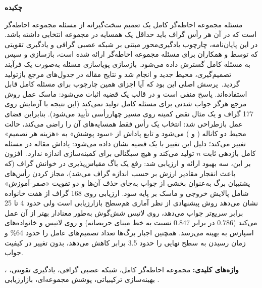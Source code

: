 \documentclass[12pt,a4paper,oneside]{report}
\providecommand{\num}[1]{#1}
\theoremstyle{definition}
\theoremstyle{plain}
\begin{document}
\begin{center}
  {\Large\bfseries چکیده}
\end{center}
\vspace{0.4cm}
\noindent
مسئله مجموعه احاطه‌گر کامل یک تعمیم سخت‌گیرانه از مسئله مجموعه احاطه‌گر است که
در آن هر رأس گراف باید حداقل یک همسایه در مجموعه انتخابی داشته باشد. در این
پایان‌نامه، چارچوب یادگیری‌محور مبتنی بر شبکه عصبی گرافی و یادگیری تقویتی که
توسط  و همکاران برای مسئله مجموعه احاطه‌گر ارائه شده است، بازسازی و
سپس به مسئله کامل گسترش داده می‌شود. بازسازی پویا‌سازی مسئله به‌صورت یک فرآیند
تصمیم‌گیری، محیط جدید و  انجام شد و نتایج مقاله در جدول‌های مرجع
بازتولید گردید.\
پرسش اصلی این بود که آیا اجزای همین چارچوب برای مسئله کامل قابل استفاده‌اند.
پاسخ منفی است و در قالب یک قضیه اثبات می‌شود: ماسک عمل روش مرجع هرگز جواب
شدنی برای مسئله کامل تولید نمی‌کند (این نتیجه با آزمایش روی \num{177} گراف و
یک مثال نقض کمینه روی مسیر چهاررأسی تأیید می‌شود). بنابراین فضای عمل بازطراحی
شد: انتخاب یک رأس فقط همسایه‌های آن را راضی می‌کند، حالت محیط دو کاناله
(\lr{coverage} و \lr{selection}) می‌شود و تابع پاداش از «سود پوشش» به «هزینه هر
تصمیم» تغییر می‌کند؛ دلیل این تغییر با یک قضیه نشان داده می‌شود: پاداش مقاله
در مسئله کامل بازدهی ثابت $n$ تولید می‌کند و هیچ سیگنالی برای کمینه‌سازی اندازه
ندارد.\
افزون بر این، سه بهبود ارائه و ارزیابی شد: رفع یک باگ مقیاس‌پذیری در خوانش
گراف (که باعث انفجار مقادیر ارزش بر حسب اندازه گراف می‌شد)، مجاز کردن رأس‌های
پشتیبان برگ به‌عنوان بخشی از جواب به‌جای حذف آن‌ها و دو تقویت «صفر-آموزش» شامل
پالایش خروجی و ماسک \lr{top-k} بر پایه سود. ارزیابی روی \num{168} گراف از هفت
خانواده نشان می‌دهد روش پیشنهادی از نظر آماری هم‌سطح بازارزیابی \lr{GRASP} است
ولی حدود \num{4} تا \num{25} برابر سریع‌تر جواب می‌دهد، روی لاتیس شش‌گوش به‌طور
معنادار بهتر از آن عمل می‌کند ($0.786$ در برابر $0.847$ نسبت به خط مبنای
حریصانه) و روی لاتیس و خانواده‌های اسپارس به بهینه می‌رسد. همچنین اجبار برگ‌ها
تعداد تصمیم‌های عامل را حدود \num{64}\% و زمان رسیدن به سطح نهایی را حدود
\num{3.5} برابر کاهش می‌دهد، بدون تغییر در کیفیت جواب.\

\vspace{0.5cm}
\noindent
\textbf{واژه‌های کلیدی:} مجموعه احاطه‌گر کامل، شبکه عصبی گرافی، یادگیری تقویتی،
\lr{DDQN}، بهینه‌سازی ترکیبیاتی، پوشش مجموعه‌ای، بازارزیابی .
\clearpage

\renewcommand{\contentsname}{فهرست مطالب}
\renewcommand{\listfigurename}{فهرست شکل‌ها}
\renewcommand{\listtablename}{فهرست جدول‌ها}
\tableofcontents
\clearpage
\listoffigures
\clearpage
\listoftables
\clearpage
\end{document}
